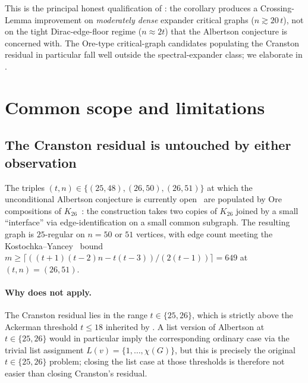 \documentclass[11pt,a4paper]{article}
\theoremstyle{definition}
\begin{document}
This is the principal honest qualification of
: the corollary produces a Crossing-Lemma
improvement on \emph{moderately dense} expander critical graphs
($n \gtrsim 20\,t$), not on the tight Dirac-edge-floor regime
($n \approx 2 t$) that the Albertson conjecture is concerned
with. The Ore-type critical-graph candidates populating the
Cranston residual in particular fall well outside the
spectral-expander class; we elaborate in .

\section{Common scope and limitations}\label{sec:scope}

\subsection{The Cranston residual is untouched by either
            observation}\label{ssec:cranston}

The triples $(t, n) \in \{(25, 48), (26, 50), (26, 51)\}$ at which
the unconditional Albertson conjecture is currently
open~\cite{Cranston} are populated by Ore compositions of
$K_{26}$~\cite{Ore}: the construction takes two copies of
$K_{26}$ joined by a small ``interface'' via edge-identification on
a small common subgraph. The resulting graph is $25$-regular on
$n = 50$ or $51$ vertices, with edge count meeting the
Kostochka--Yancey~\cite{KostochkaYancey} bound
$m \ge \lceil ((t+1)(t-2) n - t(t-3))/(2(t-1)) \rceil = 649$ at
$(t, n) = (26, 51)$.

\paragraph{Why  does not apply.}
The Cranston residual lies in the range $t \in \{25, 26\}$, which
is strictly above the Ackerman threshold $t \le 18$ inherited by
. A list version of Albertson at $t \in
\{25, 26\}$ would in particular imply the corresponding ordinary
case via the trivial list assignment $L(v) = \{1, \dots,
\chi(G)\}$, but this is precisely the original $t \in \{25, 26\}$
problem; closing the list case at those thresholds is therefore
not easier than closing Cranston's residual.
\end{document}
